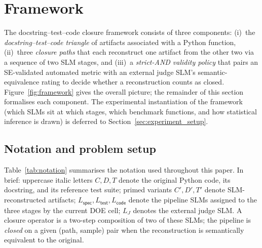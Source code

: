 \section{Framework}
\label{sec:framework}

The docstring--test--code closure framework consists of three components:
(i)~the \emph{docstring--test--code triangle} of artifacts associated with a
Python function, (ii)~three \emph{closure paths} that each reconstruct one
artifact from the other two via a sequence of two SLM stages, and
(iii)~a \emph{strict-AND validity policy} that pairs an SE-validated
automated metric with an external judge SLM's semantic-equivalence rating
to decide whether a reconstruction counts as closed. Figure~\ref{fig:framework}
gives the overall picture; the remainder of this section formalises each
component. The experimental instantiation of the framework (which SLMs sit
at which stages, which benchmark functions, and how statistical inference
is drawn) is deferred to Section~\ref{sec:experiment_setup}.



\subsection{Notation and problem setup}
\label{sec:framework_notation}

Table~\ref{tab:notation} summarises the notation used throughout this
paper. In brief: uppercase italic letters $C, D, T$ denote the original
Python code, its docstring, and its reference test suite; primed
variants $C', D', T'$ denote SLM-reconstructed artifacts; $L_{\mathsf{spec}},
L_{\mathsf{test}}, L_{\mathsf{code}}$ denote the pipeline SLMs assigned to
the three stages by the current DOE cell; $L_J$ denotes the external
judge SLM. A closure operator is a two-step composition of two of these
SLMs; the pipeline is \emph{closed} on a given (path, sample) pair when
the reconstruction is semantically equivalent to the original.

